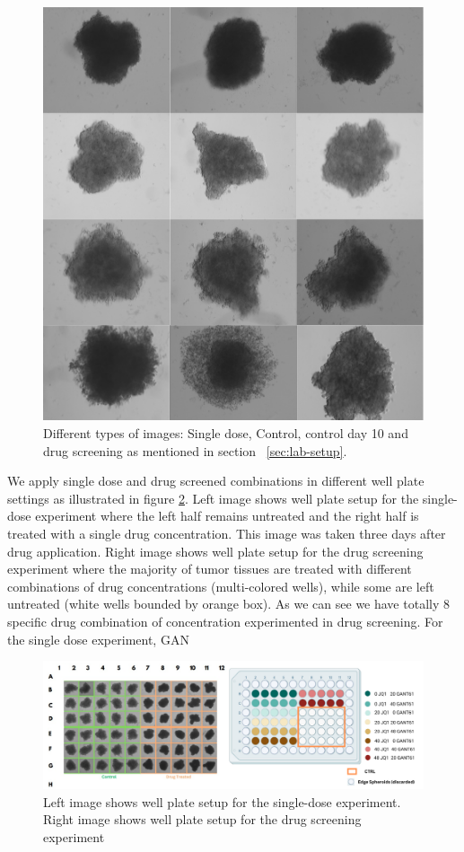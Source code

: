 \begin{figure}[H]
  \centering
  \includegraphics[scale=0.4]{figures/types.png} 
  \caption{Different types of images: Single dose, Control, control day 10 and drug screening as mentioned in section ~\ref{sec:lab-setup}.}
  \label{fig:Types}
\end{figure}

We apply single dose and drug screened combinations in different well plate settings as illustrated in figure \ref{fig:wellplate setup}. Left image shows well plate setup for the single-dose experiment where the left half remains untreated and the right half is treated with a single drug concentration. This image was taken three days after drug application. Right image shows well plate setup for the drug screening experiment where the majority of tumor tissues are treated with different combinations of drug 
concentrations (multi-colored wells), while some are left untreated (white wells bounded by orange box). As we can see we have totally 8 specific drug combination of concentration experimented in drug screening. For the single dose experiment, GAN 

\begin{figure}[H]
  \centering
  \includegraphics[width=0.9\linewidth]{figures/well.png} %
  \caption{Left image shows well plate setup for the single-dose experiment. Right image shows well plate setup for the drug screening experiment}
  \label{fig:wellplate setup}
\end{figure}



